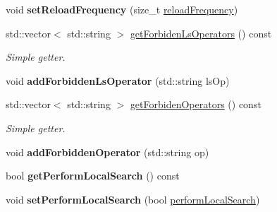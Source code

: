 \begin{DoxyCompactItemize}
\item 
\hypertarget{classALNS__Parameters_a17080f909df5fe9a43a3e90f0457a687}{void {\bfseries set\-Reload\-Frequency} (size\-\_\-t \hyperlink{classALNS__Parameters_ab3c514956945f29a6dff9a77fd5cb3ea}{reload\-Frequency})}\label{classALNS__Parameters_a17080f909df5fe9a43a3e90f0457a687}

\item 
\hypertarget{classALNS__Parameters_ad4ab7e264fd9df231a60cef52bd7774c}{std\-::vector$<$ std\-::string $>$ \hyperlink{classALNS__Parameters_ad4ab7e264fd9df231a60cef52bd7774c}{get\-Forbiden\-Ls\-Operators} () const }\label{classALNS__Parameters_ad4ab7e264fd9df231a60cef52bd7774c}

\begin{DoxyCompactList}\small\item\em Simple getter. \end{DoxyCompactList}\item 
\hypertarget{classALNS__Parameters_a9111acfa9c48a7e6e969bfd4c4908dfb}{void {\bfseries add\-Forbidden\-Ls\-Operator} (std\-::string ls\-Op)}\label{classALNS__Parameters_a9111acfa9c48a7e6e969bfd4c4908dfb}

\item 
\hypertarget{classALNS__Parameters_a609ef48dbcc7b36f2a41ffd8a3a68773}{std\-::vector$<$ std\-::string $>$ \hyperlink{classALNS__Parameters_a609ef48dbcc7b36f2a41ffd8a3a68773}{get\-Forbiden\-Operators} () const }\label{classALNS__Parameters_a609ef48dbcc7b36f2a41ffd8a3a68773}

\begin{DoxyCompactList}\small\item\em Simple getter. \end{DoxyCompactList}\item 
\hypertarget{classALNS__Parameters_a2d81a91ccf46ce1105f05ceb871e206e}{void {\bfseries add\-Forbidden\-Operator} (std\-::string op)}\label{classALNS__Parameters_a2d81a91ccf46ce1105f05ceb871e206e}

\item 
\hypertarget{classALNS__Parameters_a722eae2be52681671ca6ca9b6b6c2461}{bool {\bfseries get\-Perform\-Local\-Search} () const }\label{classALNS__Parameters_a722eae2be52681671ca6ca9b6b6c2461}

\item 
\hypertarget{classALNS__Parameters_aed8815933e774abd40be41620650ecc6}{void {\bfseries set\-Perform\-Local\-Search} (bool \hyperlink{classALNS__Parameters_a6b65081dc41bf2657da46ad28f4a9b23}{perform\-Local\-Search})}\label{classALNS__Parameters_aed8815933e774abd40be41620650ecc6}


\end{DoxyCompactItemize}
